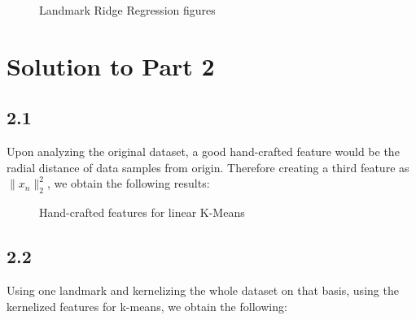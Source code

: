 \documentclass[a4paper,11pt]{article}
\begin{document}
\begin{mlsolution}
\begin{figure}[H]
    \centering
    
    
    \caption{Landmark Ridge Regression figures}
    \label{fig:part5.1.2}
\end{figure}

\section*{Solution to Part 2}
\subsection*{2.1}
Upon analyzing the original dataset, a good hand-crafted feature would be the radial distance of data samples from origin. Therefore creating a third feature as $\lVert x_n \rVert^2_2$, we obtain the following results:

\begin{figure}[H]
    \centering
    
    \caption{Hand-crafted features for linear K-Means}
    \label{fig:part5.2.1}
\end{figure}

\subsection*{2.2}
Using one landmark and kernelizing the whole dataset on that basis, using the kernelized features for k-means, we obtain the following:


\end{mlsolution}
\end{document}
